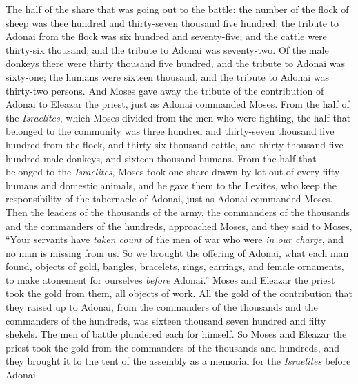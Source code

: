 \begin{biblechapter}
\verse The half of the share that was going out to the battle: the number of the flock of sheep was thee hundred and thirty-seven thousand five hundred;
\verse the tribute to Adonai from the flock was six hundred and seventy-five;
\verse and the cattle were thirty-six thousand; and the tribute to Adonai was seventy-two.
\verse Of the male donkeys there were thirty thousand five hundred, and the tribute to Adonai was sixty-one;
\verse the humans were sixteen thousand, and the tribute to Adonai was thirty-two persons.
\verse And Moses gave away the tribute of the contribution of Adonai to Eleazar the priest, just as Adonai commanded Moses.
\verse From the half of the \textit{Israelites}, which Moses divided from the men who were fighting,
\verse the half that belonged to the community was three hundred and thirty-seven thousand five hundred from the flock,
\verse and thirty-six thousand cattle,
\verse and thirty thousand five hundred male donkeys,
\verse and sixteen thousand humans.
\verse From the half that belonged to the \textit{Israelites}, Moses took one share drawn by lot out of every fifty humans and domestic animals, and he gave them to the Levites, who keep the responsibility of the tabernacle of Adonai, just as Adonai commanded Moses.
\verse Then the leaders of the thousands of the army, the commanders of the thousands and the commanders of the hundreds, approached Moses,
\verse and they said to Moses, “Your servants have \textit{taken count} of the men of war who were \textit{in our charge}, and no man is missing from us.
\verse So we brought the offering of Adonai, what each man found, objects of gold, bangles, bracelets, rings, earrings, and female ornaments, to make atonement for ourselves \textit{before} Adonai.”
\verse Moses and Eleazar the priest took the gold from them, all objects of work.
\verse All the gold of the contribution that they raised up to Adonai, from the commanders of the thousands and the commanders of the hundreds, was sixteen thousand seven hundred and fifty shekels.
\verse The men of battle plundered each for himself.
\verse So Moses and Eleazar the priest took the gold from the commanders of the thousands and hundreds, and they brought it to the tent of the assembly as a memorial for the \textit{Israelites} before Adonai.
\end{biblechapter}

